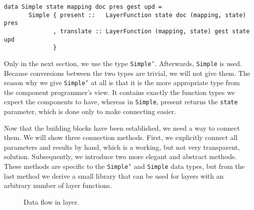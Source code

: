 \begin{small}
\begin{verbatim}
data Simple state mapping doc pres gest upd =
       Simple { present ::   LayerFunction state doc (mapping, state) pres
              , translate :: LayerFunction (mapping, state) gest state upd
              }
\end{verbatim}
\end{small}

Only in the next section, we use the type \texttt{Simple'}. Afterwards, \texttt{Simple} is used. Because conversions between the two types are trivial, we will not give them. The reason why we give \texttt{Simple'} at all is that it is the more appropriate type from the component programmer's view. It contains exactly the function types we expect the components to have, whereas in \texttt{Simple}, present returns the \texttt{state} parameter, which is done only to make connecting easier.

Now that the building blocks have been established, we need a way to connect them. We will show three connection methods. First, we explicitly connect all parameters and results by hand, which is a working, but not very transparent, solution. Subsequently, we introduce two more elegant and abstract methods. These methods are specific to the \texttt{Simple'} and \texttt{Simple} data types, but from the last method we derive a small library that can be used for layers with an arbitrary number of layer functions. 

\begin{figure}
\begin{small}
\begin{center}
\begin{center}
\begin{scriptsize}
\end{scriptsize}
\end{center}\caption{Data flow in layer.}\label{wrapped} 
\end{center}
\end{small}
\end{figure}

